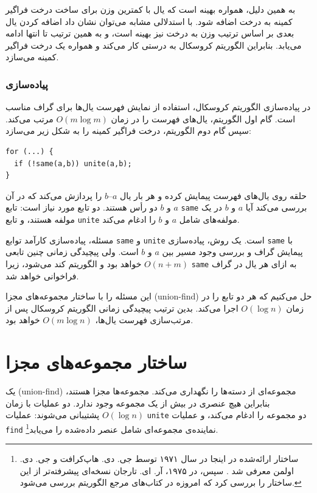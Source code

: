 به همین دلیل، همواره بهینه است که یال با کمترین وزن برای ساخت درخت فراگیر کمینه به درخت اضافه شود. با استدلالی مشابه می‌توان نشان داد اضافه کردن یال بعدی بر اساس ترتیب وزن به درخت نیز بهینه است، و به همین ترتیب تا انتها ادامه می‌یابد. بنابراین الگوریتم کروسکال به درستی کار می‌کند و همواره یک درخت فراگیر کمینه می‌سازد.

\subsubsection{پیاده‌سازی}

در پیاده‌سازی الگوریتم کروسکال، استفاده از نمایش فهرست یال‌ها برای گراف مناسب است. گام اول الگوریتم، یال‌های فهرست را در زمان $O(m \log m)$ مرتب می‌کند. سپس گام دوم الگوریتم، درخت فراگیر کمینه را به شکل زیر می‌سازد:

\begin{lstlisting}
for (...) {
  if (!same(a,b)) unite(a,b);
}
\end{lstlisting}

حلقه روی یال‌های فهرست پیمایش کرده و هر بار یال $a$--$b$ را پردازش می‌کند که در آن $a$ و $b$ دو رأس هستند. دو تابع مورد نیاز است: تابع \texttt{same} بررسی می‌کند آیا $a$ و $b$ در یک مولفه هستند، و تابع \texttt{unite} مولفه‌های شامل $a$ و $b$ را ادغام می‌کند.

مسئله، پیاده‌سازی کارآمد توابع \texttt{same} و \texttt{unite} است. یک روش، پیاده‌سازی \texttt{same} با پیمایش گراف و بررسی وجود مسیر بین $a$ و $b$ است. ولی پیچیدگی زمانی چنین تابعی $O(n+m)$ خواهد بود و الگوریتم کند می‌شود، زیرا \texttt{same} به ازای هر یال در گراف فراخوانی خواهد شد.

این مسئله را با ساختار مجموعه‌های مجزا (union-find) حل می‌کنیم که هر دو تابع را در زمان $O(\log n)$ اجرا می‌کند. بدین ترتیب پیچیدگی زمانی الگوریتم کروسکال پس از مرتب‌سازی فهرست یال‌ها، $O(m \log n)$ خواهد بود.

\section{ساختار مجموعه‌های مجزا}


یک  (union-find)
مجموعه‌ای از دسته‌ها را نگهداری می‌کند.
مجموعه‌ها مجزا هستند، بنابراین هیچ عنصری
در بیش از یک مجموعه وجود ندارد.
دو عملیات با زمان $O(\log n)$ پشتیبانی می‌شوند:
عملیات \texttt{unite} دو مجموعه را ادغام می‌کند،
و عملیات \texttt{find} نماینده‌ی مجموعه‌ای
شامل عنصر داده‌شده را می‌یابد\footnote{ساختار ارائه‌شده در اینجا
در سال ۱۹۷۱ توسط جی. دی. هاپ‌کرافت و جی. دی. اولمن معرفی شد \cite{hop71}.
سپس، در ۱۹۷۵، آر. ای. تارجان نسخه‌ای پیشرفته‌تر
از این ساختار را بررسی کرد \cite{tar75} که امروزه در کتاب‌های مرجع الگوریتم بررسی می‌شود.}.

